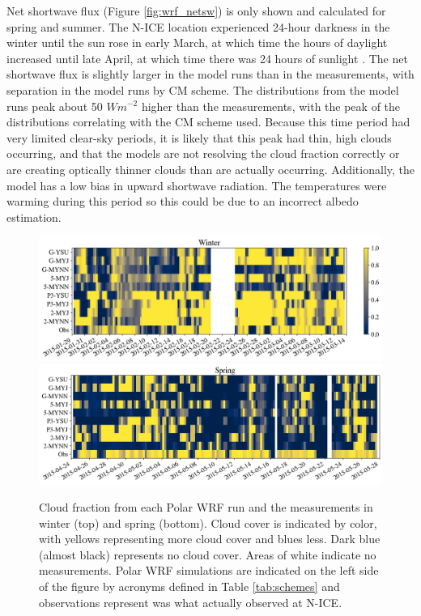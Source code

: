 Net shortwave flux (Figure \ref{fig:wrf_netsw}) is only shown and calculated for spring and summer. The N-ICE location experienced 24-hour darkness in the winter until the sun rose in early March, at which time the hours of daylight increased until late April, at which time there was 24 hours of sunlight \citep{walden:2017}. The net shortwave flux is slightly larger in the model runs than in the measurements, with separation in the model runs by CM scheme. The distributions from the model runs peak about 50 $Wm^{-2}$ higher than the measurements, with the peak of the distributions correlating with the CM scheme used. Because this time period had very limited clear-sky periods, it is likely that this peak had thin, high clouds occurring, and that the models are not resolving the cloud fraction correctly or are creating optically thinner clouds than are actually occurring. Additionally, the model has a low bias in upward shortwave radiation. The temperatures were warming during this period so this could be due to an incorrect albedo estimation. 

\begin{figure}[h]
    \centering
    \includegraphics[width=1.05\linewidth]{figures/chapter3/WRF_CloudsWinter.png}
     \hspace*{-0.5cm}\includegraphics[width=1.05\linewidth]{figures/chapter3/WRF_CloudsSpring.png}
    \caption[Polar WRF simulated cloud fraction.]{Cloud fraction from each Polar WRF run and the measurements in winter (top) and spring (bottom). Cloud cover is indicated by color, with yellows representing more cloud cover and blues less. Dark blue (almost black) represents no cloud cover. Areas of white indicate no measurements. Polar WRF simulations are indicated on the left side of the figure by acronyms defined in Table \ref{tab:schemes} and observations represent was what actually observed at N-ICE.}
\label{fig:wrf_cloudfrac}
\end{figure}

